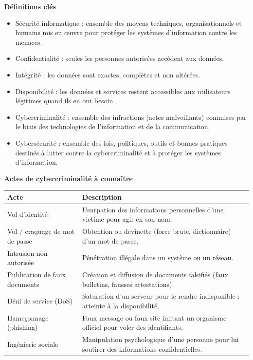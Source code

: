 \documentclass[11pt]{article}
\newcommand{\cle}[1]{{\popxbold\color{popdark}#1}}
\begin{document}
\begin{bilan}
\textbf{Définitions clés}
\begin{itemize}
  \item \cle{Sécurité informatique} : ensemble des moyens techniques, organisationnels et humains mis en \oe uvre pour protéger les systèmes d'information contre les menaces.
  \item \cle{Confidentialité} : seules les personnes autorisées accèdent aux données.
  \item \cle{Intégrité} : les données sont exactes, complètes et non altérées.
  \item \cle{Disponibilité} : les données et services restent accessibles aux utilisateurs légitimes quand ils en ont besoin.
  \item \cle{Cybercriminalité} : ensemble des infractions (actes malveillants) commises par le biais des technologies de l'information et de la communication.
  \item \cle{Cybersécurité} : ensemble des lois, politiques, outils et bonnes pratiques destinés à lutter contre la cybercriminalité et à protéger les systèmes d'information.
\end{itemize}

\textbf{Actes de cybercriminalité à connaître}
\begin{center}
\begin{tabularx}{\linewidth}{|l|X|}
\hline
\rowcolor{popblueL} \textbf{Acte} & \textbf{Description} \\
\hline
Vol d'identité & Usurpation des informations personnelles d'une victime pour agir en son nom. \\
\hline
Vol / craquage de mot de passe & Obtention ou devinette (force brute, dictionnaire) d'un mot de passe. \\
\hline
Intrusion non autorisée & Pénétration illégale dans un système ou un réseau. \\
\hline
Publication de faux documents & Création et diffusion de documents falsifiés (faux bulletins, fausses attestations). \\
\hline
Déni de service (DoS) & Saturation d'un serveur pour le rendre indisponible : atteinte à la \cle{disponibilité}. \\
\hline
Hameçonnage (phishing) & Faux message ou faux site imitant un organisme officiel pour voler des identifiants. \\
\hline
Ingénierie sociale & Manipulation psychologique d'une personne pour lui soutirer des informations confidentielles. \\
\hline
\end{tabularx}
\end{center}


\end{bilan}
\end{document}
